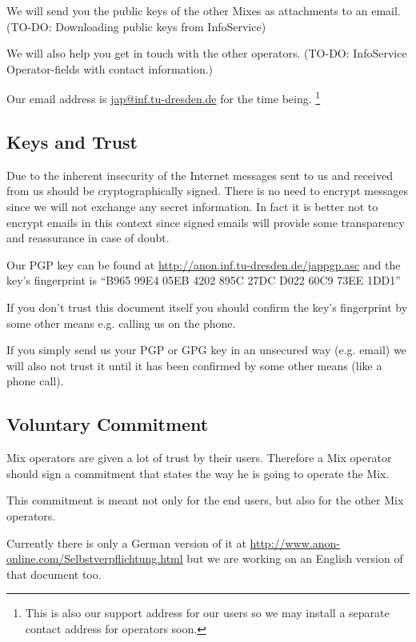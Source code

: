 \documentclass{article}
\begin{document}
We will send you the public keys of the other Mixes as attachments
to an email. (TO-DO: Downloading public keys from InfoService)

We will also help you get in touch with the other operators.
(TO-DO: InfoService Operator-fields with contact information.)

Our email address is \url{jap@inf.tu-dresden.de} for the time being.
\footnote{This is also our support address for our users so we may install a
separate contact address for operators soon.}

\subsection{Keys and Trust}

Due to the inherent insecurity of the Internet messages sent to us and
received from us should be cryptographically signed. There is no need to
encrypt messages since we will not exchange any secret information. In
fact it is better not to encrypt emails in this context since signed
emails will provide some transparency and reassurance in case of doubt.

Our PGP key can be found at \url{http://anon.inf.tu-dresden.de/jappgp.asc}
and the key's fingerprint is ``B965 99E4 05EB 4202 895C 27DC D022 60C9 73EE 1DD1''

If you don't trust this document itself you should confirm the key's
fingerprint by some other means e.g. calling us on the phone.

If you simply send us your PGP or GPG key in an unsecured way (e.g.
email) we will also not trust it until it has been confirmed by some
other means (like a phone call).


\subsection{Voluntary Commitment}

Mix operators are given a lot of trust by their users. Therefore a Mix
operator should sign a commitment that states the way he is going to
operate the Mix.

This commitment is meant not only for the end users, but also for the
other Mix operators.

Currently there is only a German version of it at
\url{http://www.anon-online.com/Selbstverpflichtung.html} but we are
working on an English version of that document too.
\end{document}

